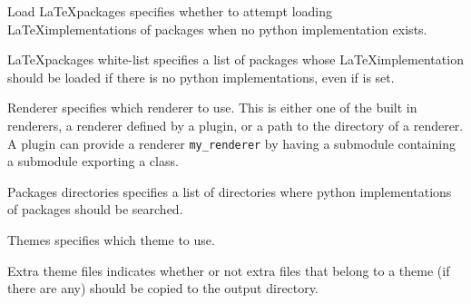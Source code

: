 \begin{configuration}{Load \LaTeX packages}
specifies whether to attempt loading \LaTeX implementations of packages
when no python implementation exists.
\end{configuration}

\begin{configuration}{\LaTeX packages white-list}
specifies a list of packages whose \LaTeX implementation should be loaded
if there is no python implementations, even if 
is set.
\end{configuration}

\begin{configuration}{Renderer}
specifies which renderer to use. This is either one of the built in renderers,
a renderer defined by a plugin, or a path to the directory of a renderer.
A plugin can provide a renderer \verb+my_renderer+ by having a
 submodule containing a  submodule exporting
a  class.
\end{configuration}

\begin{configuration}{Packages directories}
specifies a list of directories where python implementations
of packages should be searched.
\end{configuration}

\begin{configuration}{Themes}
specifies which theme to use.
\end{configuration}

\begin{configuration}{Extra theme files}
indicates whether or not extra files that belong to a theme (if there are
any) should be copied to the output directory.
\end{configuration}

